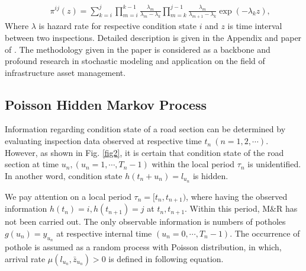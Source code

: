 \documentclass[a4paper,oneside,onecolumn,preprint,10pt,authoryear]{elsarticle}
\begin{document}
\begin{eqnarray}
&& \pi^{ij}(z)=\sum_{k=i}^{j}\prod_{m=i}^{k-1}\frac{\lambda_m}{\lambda_{m}-\lambda_{k}}\prod_{m=k}^{j-1}\frac{\lambda_m}{\lambda_{m+1}-\lambda_{k}}\exp(-\lambda_{k} z),
\end{eqnarray}
Where $\lambda$ is hazard rate for respective condition state $i$ and $z$ is time interval between two inspections. Detailed description is given in the Appendix and paper of \citet{kobayashitsuda}. The methodology given in the paper is considered as a backbone and profound research in stochastic modeling and application on the field of infrastructure asset management.
\subsection{Poisson Hidden Markov Process}
\label{sec42}
Information regarding condition state of a road section can be determined by evaluating inspection data observed at respective time  $t_n~(n=1,2,\cdots)$. However, as shown in Fig. \ref{fig2}, it is certain that condition state of the road section at time $u_n, (u_n=1,\cdots,T_n-1)$ within the local period $\tau_n$ is unidentified. In another word, condition state $h(t_n+u_n)=l_{u_n}$ is hidden. 

We pay attention on a local period $\tau_n=[t_n,t_{n+1})$, where having the observed information $h(t_n)=i,h(t_{n+1})=j$ at $t_n,t_{n+1}$. Within this period, M\&R has not been carried out. The only observable information is numbers of potholes $g(u_n)=y_{u_n}$ at respective internal time $(u_n=0,\cdots,T_n-1)$. The occurrence of pothole is assumed as a random process with Poisson distribution, in which, arrival rate $\mu(l_{u_n},\bar{z}_{u_n}) > 0 $ is defined in following equation.
\end{document}
